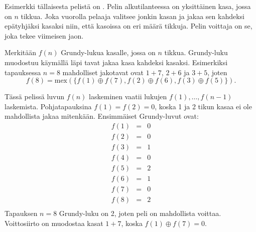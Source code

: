 
Esimerkki tällaisesta pelistä on .
Pelin alkutilanteessa on yksittäinen kasa, jossa on $n$ tikkua.
Joka vuorolla pelaaja valitsee jonkin kasan
ja jakaa sen kahdeksi epätyhjäksi kasaksi
niin, että kasoissa on eri määrä tikkuja.
Pelin voittaja on se, joka tekee viimeisen jaon.

Merkitään $f(n)$ Grundy-lukua kasalle,
jossa on $n$ tikkua.
Grundy-luku muodostuu käymällä läpi tavat
jakaa kasa kahdeksi kasaksi.
Esimerkiksi tapauksessa $n=8$ mahdolliset jakotavat
ovat $1+7$, $2+6$ ja $3+5$, joten
\[f(8)=\textrm{mex}(\{f(1) \oplus f(7), f(2) \oplus f(6), f(3) \oplus f(5)\}).\]

Tässä pelissä luvun $f(n)$ laskeminen vaatii lukujen
$f(1),\ldots,f(n-1)$ laskemista.
Pohjatapauksina $f(1)=f(2)=0$, koska 1 ja 2 tikun
kasaa ei ole mahdollista jakaa mitenkään.
Ensimmäiset Grundy-luvut ovat:
\[
\begin{array}{lcl}
f(1) & = & 0 \\
f(2) & = & 0 \\
f(3) & = & 1 \\
f(4) & = & 0 \\
f(5) & = & 2 \\
f(6) & = & 1 \\
f(7) & = & 0 \\
f(8) & = & 2 \\
\end{array}
\]
Tapauksen $n=8$ Grundy-luku on 2, joten peli on mahdollista
voittaa.
Voittosiirto on muodostaa kasat $1+7$,
koska $f(1) \oplus f(7) = 0$.

